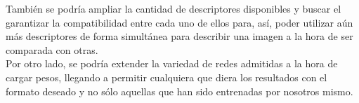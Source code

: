 También se podría ampliar la cantidad de descriptores disponibles y buscar el garantizar la compatibilidad entre cada uno de ellos para, así, poder utilizar aún más descriptores de forma simultánea para describir una imagen a la hora de ser comparada con otras.\\

Por otro lado, se podría extender la variedad de redes admitidas a la hora de cargar pesos, llegando a permitir cualquiera que diera los resultados con el formato deseado y no sólo aquellas que han sido entrenadas por nosotros mismo.
